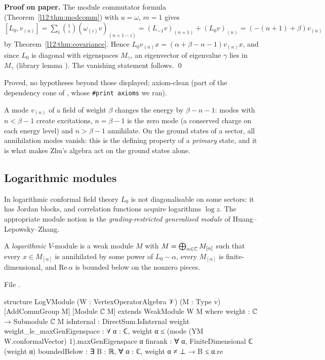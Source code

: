 \textbf{Proof on paper.} The module commutator formula (Theorem~\ref{l12:thm:modcomm}) with $u=\omega$,
$m = 1$ gives $[L_0,v_{(n)}] = \sum_i\binom1i(\omega_{(i)}v)_{(n+1-i)} = (L_{-1}v)_{(n+1)} + (L_0v)_{(n)}
= (-(n+1)+\beta)v_{(n)}$ by Theorem~\ref{l12:thm:covariance}. Hence $L_0v_{(n)}x = (\alpha+\beta-n-1)v_{(n)}x$,
and since $L_0$ is diagonal with eigenspaces $M_\gamma$, an eigenvector of eigenvalue $\gamma$ lies in
$M_\gamma$ (library lemma ). The vanishing statement follows. \qed

\begin{status}
Proved, no hypotheses beyond those displayed; axiom-clean (part of the dependency cone of
, whose \texttt{\#print axioms} we ran).
\end{status}

\begin{physics}
A mode $v_{(n)}$ of a field of weight $\beta$ changes the energy by $\beta-n-1$: modes with $n<\beta-1$ create
excitations, $n=\beta-1$ is the zero mode (a conserved charge on each energy level) and $n>\beta-1$ annihilate. On
the ground states of a sector, all annihilation modes vanish: this is the defining property of a \emph{primary}
state, and it is what makes Zhu's algebra act on the ground states alone.
\end{physics}

\subsection{Logarithmic modules}

In logarithmic conformal field theory $L_0$ is not diagonalisable on some sectors: it has Jordan
blocks, and correlation functions acquire logarithms $\log z$. The appropriate module notion is the
\emph{grading-restricted generalised module} of Huang--Lepowsky--Zhang.

\begin{definition}\label{l12:def:log}
A \emph{logarithmic} $V$-module is a weak module $M$ with $M = \bigoplus_{\alpha\in{\mathbb{C}}}M_{[\alpha]}$ such
that every $x\in M_{[\alpha]}$ is annihilated by some power of $L_0-\alpha$, every $M_{[\alpha]}$ is
finite-dimensional, and $\mathrm{Re}\,\alpha$ is bounded below on the nonzero pieces.
\end{definition}
\noindent File .
\begin{leancode}
structure LogVModule (W : VertexOperatorAlgebra 𝒱) (M : Type v)
    [AddCommGroup M] [Module ℂ M] extends WeakModule W M where
  weight : ℂ → Submodule ℂ M
  isInternal : DirectSum.IsInternal weight
  weight_le_maxGenEigenspace :
    ∀ α : ℂ, weight α ≤ (mode (YM W.conformalVector) 1).maxGenEigenspace α
  finrank : ∀ α, FiniteDimensional ℂ (weight α)
  boundedBelow : ∃ B : ℝ, ∀ α : ℂ, weight α ≠ ⊥ → B ≤ α.re
\end{leancode}

